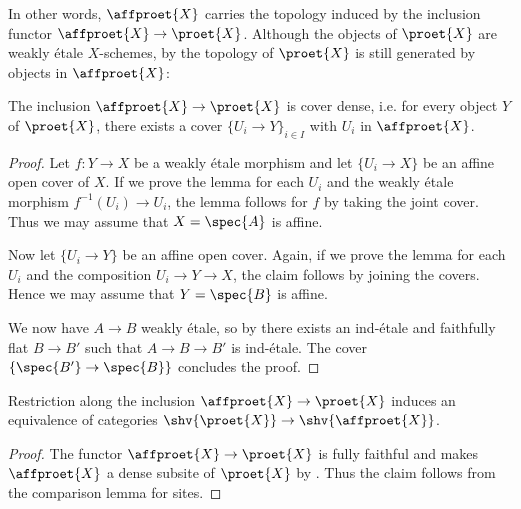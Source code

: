 In other words, $\affproet{X}$ carries the topology induced by the inclusion functor
$\affproet{X} \to \proet{X}$. Although the objects of $\proet{X}$ are weakly étale $X$-schemes,
by  the topology of $\proet{X}$ is still generated
by objects in $\affproet{X}$:

\begin{proposition}
    The inclusion $\affproet{X} \to \proet{X}$ is cover dense, i.e. for every object $Y$ of $\proet{X}$,
    there exists a cover $\{U_i \to Y\}_{i \in I}$ with $U_i$ in $\affproet{X}$.
    \label{lemma:affproet-gen-proet}
\end{proposition}

\begin{proof}
    Let $f\colon Y \to X$ be a weakly étale morphism and let $\{U_i \to X\}$ be an affine open cover of $X$.
    If we prove the lemma for each $U_i$ and the weakly étale morphism $f^{-1}(U_i) \to U_i$,
    the lemma follows for $f$ by taking the joint cover. Thus we may assume that $X = \spec{A}$
    is affine.

    Now let $\{U_i \to Y\}$ be an affine open cover. Again, if we prove the lemma for each $U_i$
    and the composition $U_i \to Y \to X$, the claim follows by joining the covers. Hence
    we may assume that $Y = \spec{B}$ is affine.

    We now have $A \to B$ weakly étale, so by  there exists an ind-étale and
    faithfully flat $B \to B'$ such that $A \to B \to B'$ is ind-étale. The
    cover $\{ \spec{B'} \to \spec{B} \}$ concludes the proof.
\end{proof}

\begin{corollary}

\leanok
    Restriction along the inclusion $\affproet{X} \to \proet{X}$ induces an equivalence of categories
    $\shv{\proet{X}} \to \shv{\affproet{X}}$.
    \label{cor:affproet-equivalence}
\end{corollary}

\begin{proof}
    The functor $\affproet{X} \to \proet{X}$ is fully faithful and makes $\affproet{X}$ a dense
    subsite of $\proet{X}$ by . Thus the claim follows
    from the comparison lemma for sites.
\end{proof}

